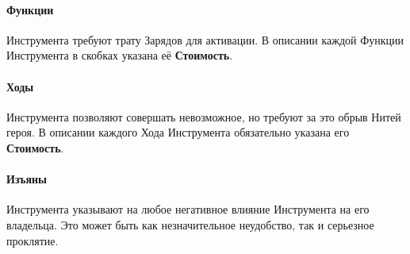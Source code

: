 \paragraph{Функции }Инструмента требуют трату Зарядов для активации. В описании каждой Функции Инструмента в скобках указана её \textbf{Стоимость}.
\paragraph{Ходы }Инструмента позволяют совершать невозможное, но требуют за это обрыв Нитей героя. В описании каждого Хода Инструмента обязательно указана его \textbf{Стоимость}.
\paragraph{Изъяны }Инструмента указывают на любое негативное влияние Инструмента на его владельца. Это может быть как незначительное неудобство, так и серьезное проклятие.
